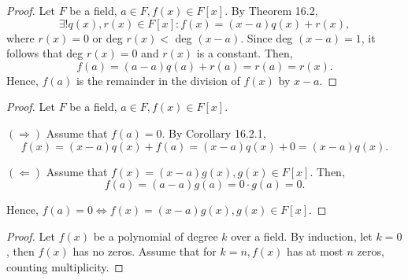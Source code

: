 \documentclass{article}
\newtheorem{corollary}{Corollary}[theorem]
\theoremstyle{definition}
\begin{document}
\begin{proof}
      Let $F$ be a field, $a\in F, f(x)\in F[x]$. By Theorem 16.2, 
      \begin{equation*}
          \exists! q(x), r(x) \in F[x]: f(x)=(x-a)q(x)+r(x),
      \end{equation*}
      where $r(x)=0$ or deg $r(x) <$ deg $(x-a)$. Since deg $(x-a)=1$, it follows that deg $r(x)=0$ and $r(x)$ is a constant. Then,
      \begin{equation*}
          f(a)=(a-a)q(a)+r(a)=r(a)=r(x).
      \end{equation*}
      Hence, $f(a)$ is the remainder in the division of $f(x)$ by $x-a$.
\end{proof}

\noindent{}

\begin{proof}
      Let $F$ be a field, $a\in F, f(x)\in F[x]$.
      
      $(\Rightarrow)$ Assume that $f(a)=0$. By Corollary 16.2.1,
      \begin{equation*}
          f(x)=(x-a)q(x)+f(a)=(x-a)q(x)+0=(x-a)q(x).
      \end{equation*}
      
      $(\Leftarrow)$ Assume that $f(x)=(x-a)g(x),g(x)\in F[x]$. Then,
      \begin{equation*}
          f(a)=(a-a)g(a)=0\cdot g(a)=0.
      \end{equation*}
      
      Hence, $f(a)=0 \iff f(x)=(x-a)g(x), g(x)\in F[x]$.
\end{proof}

\noindent{}

\begin{proof}
      Let $f(x)$ be a polynomial of degree $k$ over a field. By induction, let $k=0$, then $f(x)$ has no zeros. Assume that for $k=n, f(x)$ has at most $n$ zeros, counting multiplicity. 
\end{proof}
\end{document}
